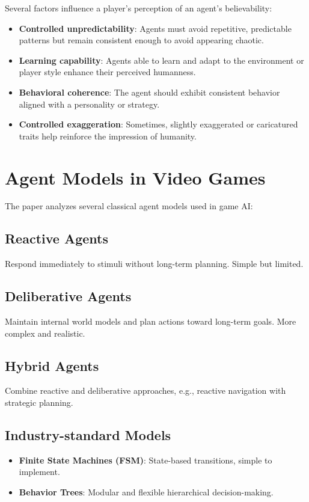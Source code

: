 \documentclass[a4paper,11pt]{article}
\begin{document}
Several factors influence a player's perception of an agent's believability:

\begin{itemize}
    \item \textbf{Controlled unpredictability}: Agents must avoid repetitive, predictable patterns but remain consistent enough to avoid appearing chaotic.
    \item \textbf{Learning capability}: Agents able to learn and adapt to the environment or player style enhance their perceived humanness.
    \item \textbf{Behavioral coherence}: The agent should exhibit consistent behavior aligned with a personality or strategy.
    \item \textbf{Controlled exaggeration}: Sometimes, slightly exaggerated or caricatured traits help reinforce the impression of humanity.
\end{itemize}

\section{Agent Models in Video Games}

The paper analyzes several classical agent models used in game AI:

\subsection{Reactive Agents}
Respond immediately to stimuli without long-term planning. Simple but limited.

\subsection{Deliberative Agents}
Maintain internal world models and plan actions toward long-term goals. More complex and realistic.

\subsection{Hybrid Agents}
Combine reactive and deliberative approaches, e.g., reactive navigation with strategic planning.

\subsection{Industry-standard Models}
\begin{itemize}
    \item \textbf{Finite State Machines (FSM)}: State-based transitions, simple to implement.
    \item \textbf{Behavior Trees}: Modular and flexible hierarchical decision-making.
\end{itemize}
\end{document}
